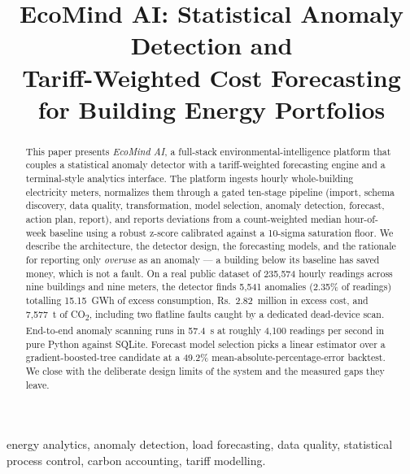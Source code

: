 \documentclass[conference, 10pt, a4paper]{IEEEtran}
\begin{document}
\title{EcoMind AI: Statistical Anomaly Detection and\\Tariff-Weighted Cost Forecasting\\for Building Energy Portfolios}

\author{%
}

\maketitle

\begin{abstract}
This paper presents \emph{EcoMind AI}, a full-stack environmental-intelligence
platform that couples a statistical anomaly detector with a tariff-weighted
forecasting engine and a terminal-style analytics interface. The platform
ingests hourly whole-building electricity meters, normalizes them through a
gated ten-stage pipeline (import, schema discovery, data quality,
transformation, model selection, anomaly detection, forecast, action plan,
report), and reports deviations from a count-weighted median hour-of-week
baseline using a robust z-score calibrated against a 10-sigma saturation
floor. We describe the architecture, the detector design, the forecasting
models, and the rationale for reporting only \emph{overuse} as an anomaly
— a building below its baseline has saved money, which is not a fault. On a
real public dataset of 235,574 hourly readings across nine buildings and nine
meters, the detector finds 5,541 anomalies (2.35\% of readings) totalling
15.15~GWh of excess consumption, Rs.~2.82~million in excess cost, and
7,577~t of CO\textsubscript{2}, including two flatline faults caught by a
dedicated dead-device scan. End-to-end anomaly scanning runs in 57.4~s at
roughly 4,100 readings per second in pure Python against SQLite. Forecast
model selection picks a linear estimator over a gradient-boosted-tree
candidate at a 49.2\% mean-absolute-percentage-error backtest. We close with
the deliberate design limits of the system and the measured gaps they leave.
\end{abstract}

\begin{IEEEkeywords}
energy analytics, anomaly detection, load forecasting, data quality,
statistical process control, carbon accounting, tariff modelling.
\end{IEEEkeywords}
\end{document}
